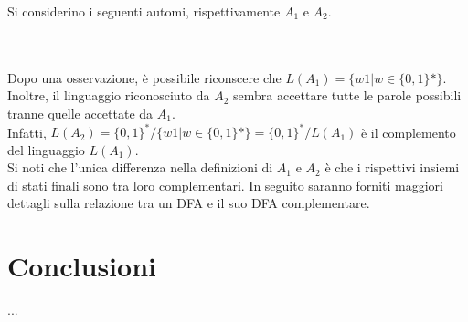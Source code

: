 \documentclass[]{article}
\begin{document}
Si considerino i seguenti automi, rispettivamente \mbox{$A_1$} e \mbox{$A_2$}.
\\
\\
\\
Dopo una osservazione, è possibile riconscere che \mbox{$ L(A_1) = \{ w1 | w \in \{ 0, 1 \}* \} $}.
Inoltre, il linguaggio riconosciuto da \mbox{$A_2$} sembra accettare tutte le parole possibili tranne
quelle accettate da \mbox{$A_1$}.
\\
Infatti, \mbox{$ L(A_2) = \{ 0, 1 \}^* / \{ w1 | w \in \{ 0, 1 \}* \} = \{ 0, 1 \}^* / L(A_1) $} è il
complemento del linguaggio \mbox{$L(A_1)$}.
\\
Si noti che l'unica differenza nella definizioni di \mbox{$A_1$} e \mbox{$A_2$} è che i rispettivi
insiemi di stati finali sono tra loro complementari. In seguito saranno forniti maggiori dettagli sulla
relazione tra un DFA e il suo DFA complementare.



\newpage
\section*{Conclusioni}

...
\end{document}
